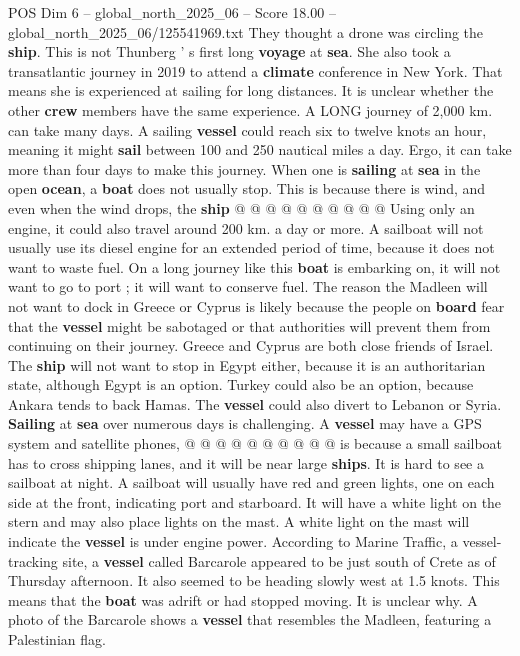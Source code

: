 \begin{textsample}{POS Dim 6 – global\_north\_2025\_06 – Score 18.00 – global\_north\_2025\_06/125541969.txt}
They thought a drone was circling the \textbf{ship}.
This is not Thunberg ' s first long \textbf{voyage} at \textbf{sea}.
She also took a transatlantic journey in 2019 to attend a \textbf{climate} conference in New York.
That means she is experienced at sailing for long distances.
It is unclear whether the other \textbf{crew} members have the same experience.
A LONG journey of 2,000 km. can take many days.
A sailing \textbf{vessel} could reach six to twelve knots an hour, meaning it might \textbf{sail} between 100 and 250 nautical miles a day.
Ergo, it can take more than four days to make this journey.
When one is \textbf{sailing} at \textbf{sea} in the open \textbf{ocean}, a \textbf{boat} does not usually stop.
This is because there is wind, and even when the wind drops, the \textbf{ship} @ @ @ @ @ @ @ @ @ @ Using only an engine, it could also travel around 200 km. a day or more.
A sailboat will not usually use its diesel engine for an extended period of time, because it does not want to waste fuel.
On a long journey like this \textbf{boat} is embarking on, it will not want to go to port ; it will want to conserve fuel.
The reason the Madleen will not want to dock in Greece or Cyprus is likely because the people on \textbf{board} fear that the \textbf{vessel} might be sabotaged or that authorities will prevent them from continuing on their journey.
Greece and Cyprus are both close friends of Israel.
The \textbf{ship} will not want to stop in Egypt either, because it is an authoritarian state, although Egypt is an option.
Turkey could also be an option, because Ankara tends to back Hamas.
The \textbf{vessel} could also divert to Lebanon or Syria. \textbf{Sailing} at \textbf{sea} over numerous days is challenging.
A \textbf{vessel} may have a GPS system and satellite phones, @ @ @ @ @ @ @ @ @ @ is because a small sailboat has to cross shipping lanes, and it will be near large \textbf{ships}.
It is hard to see a sailboat at night.
A sailboat will usually have red and green lights, one on each side at the front, indicating port and starboard.
It will have a white light on the stern and may also place lights on the mast.
A white light on the mast will indicate the \textbf{vessel} is under engine power.
According to Marine Traffic, a vessel-tracking site, a \textbf{vessel} called Barcarole appeared to be just south of Crete as of Thursday afternoon.
It also seemed to be heading slowly west at 1.5 knots.
This means that the \textbf{boat} was adrift or had stopped moving.
It is unclear why.
A photo of the Barcarole shows a \textbf{vessel} that resembles the Madleen, featuring a Palestinian flag.

\end{textsample}
